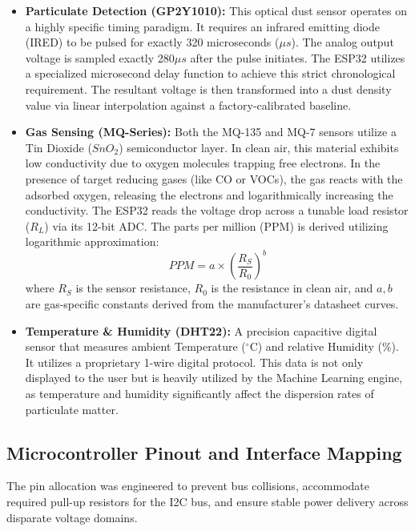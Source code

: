 \documentclass[12pt,journal,onecolumn,a4paper]{IEEEtran}
\begin{document}
\begin{itemize}
    \item \textbf{Particulate Detection (GP2Y1010):} This optical dust sensor operates on a highly specific timing paradigm. It requires an infrared emitting diode (IRED) to be pulsed for exactly 320 microseconds ($\mu s$). The analog output voltage is sampled exactly 280$\mu s$ after the pulse initiates. The ESP32 utilizes a specialized microsecond delay function to achieve this strict chronological requirement. The resultant voltage is then transformed into a dust density value via linear interpolation against a factory-calibrated baseline.
    
    \item \textbf{Gas Sensing (MQ-Series):} Both the MQ-135 and MQ-7 sensors utilize a Tin Dioxide ($SnO_2$) semiconductor layer. In clean air, this material exhibits low conductivity due to oxygen molecules trapping free electrons. In the presence of target reducing gases (like CO or VOCs), the gas reacts with the adsorbed oxygen, releasing the electrons and logarithmically increasing the conductivity. 
    The ESP32 reads the voltage drop across a tunable load resistor ($R_L$) via its 12-bit ADC. The parts per million (PPM) is derived utilizing logarithmic approximation:
    \begin{equation}
        PPM = a \times \left(\frac{R_S}{R_0}\right)^b
    \end{equation}
    where $R_S$ is the sensor resistance, $R_0$ is the resistance in clean air, and $a, b$ are gas-specific constants derived from the manufacturer's datasheet curves.
    
    \item \textbf{Temperature \& Humidity (DHT22):} A precision capacitive digital sensor that measures ambient Temperature ($^\circ$C) and relative Humidity (\%). It utilizes a proprietary 1-wire digital protocol. This data is not only displayed to the user but is heavily utilized by the Machine Learning engine, as temperature and humidity significantly affect the dispersion rates of particulate matter.
\end{itemize}

\subsection{Microcontroller Pinout and Interface Mapping}
The pin allocation was engineered to prevent bus collisions, accommodate required pull-up resistors for the I2C bus, and ensure stable power delivery across disparate voltage domains.
\end{document}
